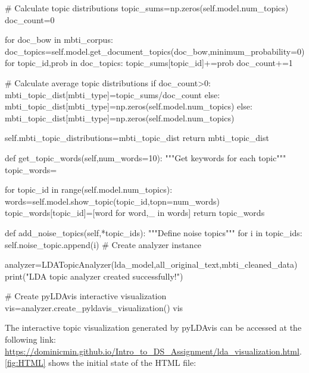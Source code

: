 \documentclass[12pt]{article}
\numberwithin{figure}{section}  %
\begin{document}
\begin{python}
                # Calculate topic distributions
                topic_sums=np.zeros(self.model.num_topics)
                doc_count=0
                
                for doc_bow in mbti_corpus:
                    doc_topics=self.model.get_document_topics(doc_bow,minimum_probability=0)
                    for topic_id,prob in doc_topics:
                        topic_sums[topic_id]+=prob
                    doc_count+=1
                
                # Calculate average topic distributions
                if doc_count>0:
                    mbti_topic_dist[mbti_type]=topic_sums/doc_count
                else:
                    mbti_topic_dist[mbti_type]=np.zeros(self.model.num_topics)
            else:
                mbti_topic_dist[mbti_type]=np.zeros(self.model.num_topics)
        
        self.mbti_topic_distributions=mbti_topic_dist
        return mbti_topic_dist
    
    def get_topic_words(self,num_words=10):
        """Get keywords for each topic"""
        topic_words={}

        for topic_id in range(self.model.num_topics):
            words=self.model.show_topic(topic_id,topn=num_words)
            topic_words[topic_id]=[word for word,_ in words]
        return topic_words
    
    def add_noise_topics(self,*topic_ids):
        """Define noise topics"""
        for i in topic_ids:
            self.noise_topic.append(i)
# Create analyzer instance

analyzer=LDATopicAnalyzer(lda_model,all_original_text,mbti_cleaned_data)
print("LDA topic analyzer created successfully!")

# Create pyLDAvis interactive visualization
vis=analyzer.create_pyldavis_visualization()
vis
	\end{python}

	The interactive topic visualization generated by pyLDAvis can be accessed at
	the following link:
	\url{https://dominicmin.github.io/Intro_to_DS_Assignment/lda_visualization.html}.
	\cref{fig:HTML} shows the initial state of the HTML file: 
	
\end{document}
